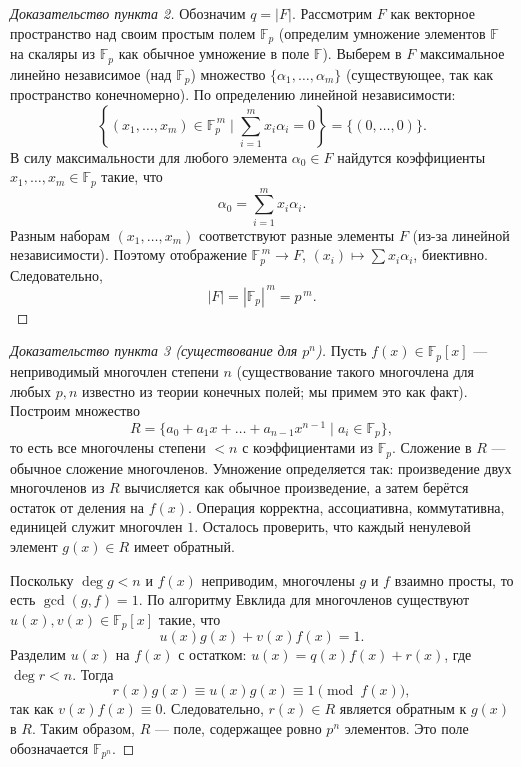 \documentclass[10pt]{article}
\begin{document}
\begin{proof}[Доказательство пункта 2]
    Обозначим $q = |F|$. Рассмотрим $F$ как векторное пространство над своим простым полем $\mathbb{F}_p$ (определим умножение элементов $\mathbb{F}$ на скаляры из $\mathbb{F}_p$ как обычное умножение в поле $\mathbb{F}$). Выберем в $F$ максимальное линейно независимое (над $\mathbb{F}_p$) множество $\{\alpha_1, \dots, \alpha_m\}$ (существующее, так как пространство конечномерно). По определению линейной независимости:
    \[
    \left\{(x_1,\dots,x_m) \in \mathbb{F}_p^{\,m} \mid \sum_{i=1}^m x_i \alpha_i = 0 \right\} = \{(0,\dots,0)\}.
    \]
    В силу максимальности для любого элемента $\alpha_0 \in F$ найдутся коэффициенты $x_1,\dots,x_m \in \mathbb{F}_p$ такие, что
    \[
    \alpha_0 = \sum_{i=1}^m x_i \alpha_i.
    \]
    Разным наборам $(x_1,\dots,x_m)$ соответствуют разные элементы $F$ (из-за линейной независимости). Поэтому отображение $\mathbb{F}_p^{\,m} \to F$, $(x_i) \mapsto \sum x_i\alpha_i$, биективно. Следовательно,
    \[
    |F| = |\mathbb{F}_p|^{\,m} = p^{\,m}.
    \]
\end{proof}

\begin{proof}[Доказательство пункта 3 (существование для $p^n$)]
    Пусть $f(x) \in \mathbb{F}_p[x]$ — неприводимый многочлен степени $n$ (существование такого многочлена для любых $p,n$ известно из теории конечных полей; мы примем это как факт). Построим множество
    \[
    R = \{ a_0 + a_1 x + \dots + a_{n-1} x^{n-1} \mid a_i \in \mathbb{F}_p \},
    \]
    то есть все многочлены степени $< n$ с коэффициентами из $\mathbb{F}_p$. Сложение в $R$ — обычное сложение многочленов. Умножение определяется так: произведение двух многочленов из $R$ вычисляется как обычное произведение, а затем берётся остаток от деления на $f(x)$. Операция корректна, ассоциативна, коммутативна, единицей служит многочлен $1$. Осталось проверить, что каждый ненулевой элемент $g(x) \in R$ имеет обратный.
    
    Поскольку $\deg g < n$ и $f(x)$ неприводим, многочлены $g$ и $f$ взаимно просты, то есть $\gcd(g,f)=1$. По алгоритму Евклида для многочленов существуют $u(x), v(x) \in \mathbb{F}_p[x]$ такие, что
    \[
    u(x)g(x) + v(x)f(x) = 1.
    \]
    Разделим $u(x)$ на $f(x)$ с остатком: $u(x) = q(x)f(x) + r(x)$, где $\deg r < n$. Тогда
    \[
    r(x)g(x) \equiv u(x)g(x) \equiv 1 \pmod{f(x)},
    \]
    так как $v(x)f(x) \equiv 0$. Следовательно, $r(x) \in R$ является обратным к $g(x)$ в $R$. Таким образом, $R$ — поле, содержащее ровно $p^n$ элементов. Это поле обозначается $\mathbb{F}_{p^n}$.
\end{proof}
\end{document}
